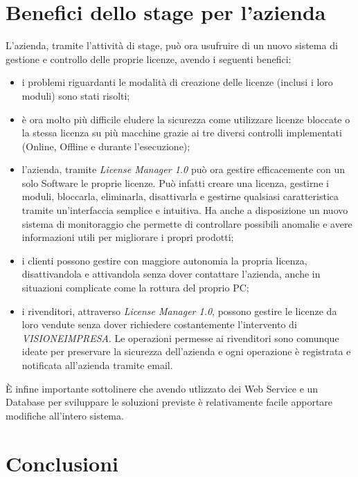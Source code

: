 \section{Benefici dello stage per l'azienda}
L'azienda, tramite l'attività di stage, può ora usufruire di un nuovo sistema di gestione e controllo delle proprie licenze, avendo i seguenti benefici:
\begin{itemize}
\item i problemi riguardanti le modalità di creazione delle licenze (inclusi i loro moduli) sono stati risolti;
\item è ora molto più difficile eludere la sicurezza come utilizzare licenze bloccate o la stessa licenza su più macchine grazie ai tre diversi controlli implementati (Online, Offline e durante l'esecuzione);
\item l'azienda, tramite \textit{License Manager 1.0} può ora gestire efficacemente con un solo Software le proprie licenze. Può infatti creare una licenza, gestirne i moduli, bloccarla, eliminarla, disattivarla e gestirne qualsiasi caratteristica tramite un'interfaccia semplice e intuitiva. Ha anche a disposizione un nuovo sistema di monitoraggio che permette di controllare possibili anomalie e avere informazioni utili per migliorare i propri prodotti;
\item i clienti possono gestire con maggiore autonomia la propria licenza, disattivandola e attivandola senza dover contattare l'azienda, anche in situazioni complicate come la rottura del proprio PC;
\item i rivenditori, attraverso \textit{License Manager 1.0}, possono gestire le licenze da loro vendute senza dover richiedere costantemente l'intervento di \textit{VISIONEIMPRESA}. Le operazioni permesse ai rivenditori sono comunque ideate per preservare la sicurezza dell'azienda e ogni operazione è registrata e notificata all'azienda tramite email.
\end{itemize}

È infine importante sottolinere che avendo utlizzato dei Web Service e un Database per sviluppare le soluzioni previste è relativamente facile apportare modifiche all'intero sistema.

\section{Conclusioni}

